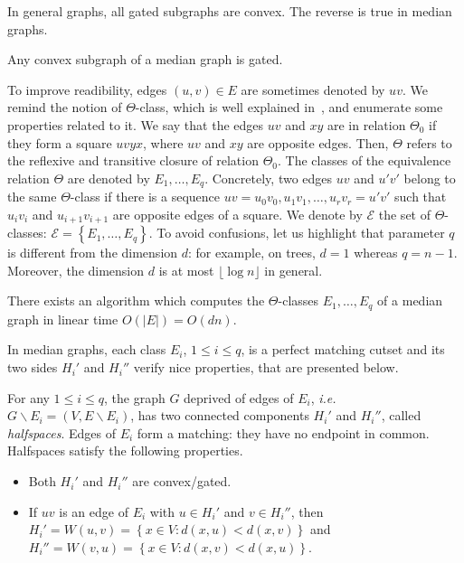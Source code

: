 \documentclass[a4paper,UKenglish,numberwithinsect,cleveref, autoref,anonymous]{lipics-v2021}
\newcommand{\set}[1]{\left\{ #1 \right\}}
\newcommand{\card}[1]{\left| #1 \right|}
\begin{document}
In general graphs, all gated subgraphs are convex. The reverse is true in median graphs.
\begin{lemma}
Any convex subgraph of a median graph is gated.
\end{lemma}

To improve readibility, edges $(u,v) \in E$ are sometimes denoted by $uv$. We remind the notion of $\Theta$-class, which is well explained in~\cite{BeChChVa20}, and enumerate some properties related to it. We say that the edges $uv$ and $xy$ are in relation $\Theta_0$ if they form a square $uvyx$, where $uv$ and $xy$ are opposite edges. Then, $\Theta$ refers to the reflexive and transitive closure of relation $\Theta_0$. The classes of the equivalence relation $\Theta$ are denoted by $E_1,\ldots,E_q$. Concretely, two edges $uv$ and $u'v'$ belong to the same $\Theta$-class if there is a sequence $uv = u_0v_0, u_1v_1, \ldots, u_rv_r= u'v'$ such that $u_iv_i$ and $u_{i+1}v_{i+1}$ are opposite edges of a square. We denote by $\mathcal{E}$ the set of $\Theta$-classes: $\mathcal{E} = \set{E_1,\ldots,E_q}$. To avoid confusions, let us highlight that parameter $q$ is different from the dimension $d$: for example, on trees, $d=1$ whereas $q = n-1$. Moreover, the dimension $d$ is at most $\lfloor \log n \rfloor$ in general.

\begin{lemma}
There exists an algorithm which computes the $\Theta$-classes $E_1,\ldots,E_q$ of a median graph in linear time $O(\card{E}) = O(dn)$.
\label{le:linear_classes}
\end{lemma}

In median graphs, each class $E_i$, $1\le i\le q$, is a perfect matching cutset and its two sides $H_i'$ and $H_i''$ verify nice properties, that are presented below.

\begin{lemma}
For any $1\le i\le q$, the graph $G$ deprived of edges of $E_i$, {\em i.e.} $G\backslash E_i = (V,E\backslash E_i)$, has two connected components $H_i'$ and $H_i''$, called \textit{halfspaces}. Edges of $E_i$ form a matching: they have no endpoint in common. Halfspaces satisfy the following properties.
\begin{itemize}
\item Both $H_i'$ and $H_i''$ are convex/gated.
\item If $uv$ is an edge of $E_i$ with $u \in H_i'$ and $v \in H_i''$, then $H_i' = W(u,v) = \set{x \in V: d(x,u) < d(x,v)}$ and $H_i'' = W(v,u) = \set{x \in V: d(x,v) < d(x,u)}$.
\end{itemize}
\label{le:halfspaces}
\end{lemma}
\end{document}
